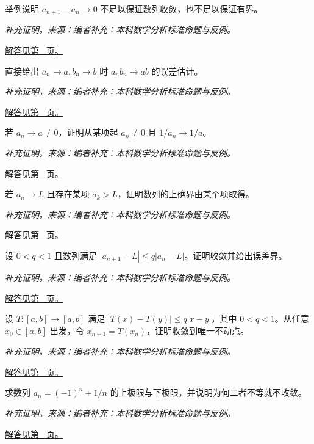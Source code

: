 \documentclass[UTF8,12pt,a4paper,fontset=fandol]{ctexart}
\begin{document}
\begin{example}[相邻差趋零并不保证收敛]\label{ex:c2q14}
举例说明 $a_{n+1}-a_n\to0$ 不足以保证数列收敛，也不足以保证有界。
\par\textit{补充证明。来源：编者补充：本科数学分析标准命题与反例。}\par\hyperref[ans:c2q14]{解答见第~\pageref{ans:c2q14} 页。}
\end{example}
\begin{example}[乘积数列的极限]\label{ex:c2q15}
直接给出 $a_n\to a,b_n\to b$ 时 $a_nb_n\to ab$ 的误差估计。
\par\textit{补充证明。来源：编者补充：本科数学分析标准命题与反例。}\par\hyperref[ans:c2q15]{解答见第~\pageref{ans:c2q15} 页。}
\end{example}
\begin{example}[倒数数列的极限]\label{ex:c2q16}
若 $a_n\to a\ne0$，证明从某项起 $a_n\ne0$ 且 $1/a_n\to1/a$。
\par\textit{补充证明。来源：编者补充：本科数学分析标准命题与反例。}\par\hyperref[ans:c2q16]{解答见第~\pageref{ans:c2q16} 页。}
\end{example}
\begin{example}[收敛数列与极值取得]\label{ex:c2q17}
若 $a_n\to L$ 且存在某项 $a_k>L$，证明数列的上确界由某个项取得。
\par\textit{补充证明。来源：编者补充：本科数学分析标准命题与反例。}\par\hyperref[ans:c2q17]{解答见第~\pageref{ans:c2q17} 页。}
\end{example}
\begin{example}[递推压缩的几何误差]\label{ex:c2q18}
设 $0<q<1$ 且数列满足 $|a_{n+1}-L|\le q|a_n-L|$。证明收敛并给出误差界。
\par\textit{补充证明。来源：编者补充：本科数学分析标准命题与反例。}\par\hyperref[ans:c2q18]{解答见第~\pageref{ans:c2q18} 页。}
\end{example}
\begin{example}[递推收敛与不动点存在]\label{ex:c2q19}
设 $T:[a,b]\to[a,b]$ 满足 $|T(x)-T(y)|\le q|x-y|$，其中 $0<q<1$。从任意 $x_0\in[a,b]$ 出发，令 $x_{n+1}=T(x_n)$，证明收敛到唯一不动点。
\par\textit{补充证明。来源：编者补充：本科数学分析标准命题与反例。}\par\hyperref[ans:c2q19]{解答见第~\pageref{ans:c2q19} 页。}
\end{example}
\begin{example}[上、下极限的简单计算]\label{ex:c2q20}
求数列 $a_n=(-1)^n+1/n$ 的上极限与下极限，并说明为何二者不等就不收敛。
\par\textit{补充证明。来源：编者补充：本科数学分析标准命题与反例。}\par\hyperref[ans:c2q20]{解答见第~\pageref{ans:c2q20} 页。}
\end{example}
\end{document}
